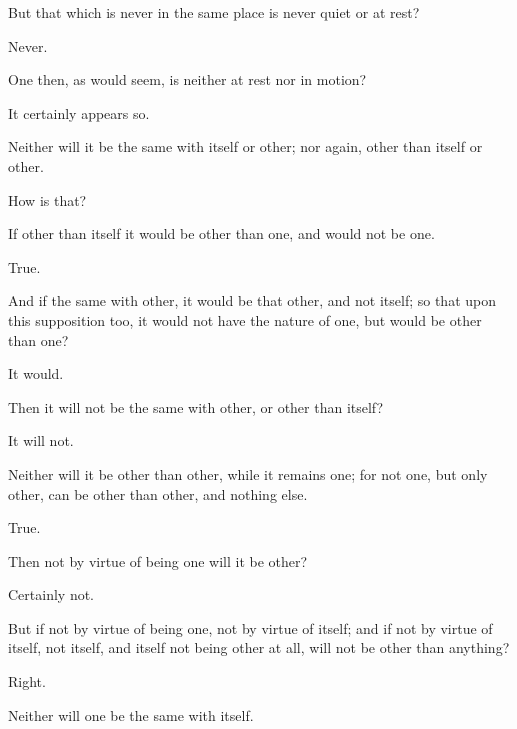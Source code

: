\documentclass[11pt,letter]{article}
\begin{document}
\par  But that which is never in the same place is never quiet or at rest?

\par  Never.

\par  One then, as would seem, is neither at rest nor in motion?

\par  It certainly appears so.

\par  Neither will it be the same with itself or other; nor again, other than itself or other.

\par  How is that?

\par  If other than itself it would be other than one, and would not be one.

\par  True.

\par  And if the same with other, it would be that other, and not itself; so that upon this supposition too, it would not have the nature of one, but would be other than one?

\par  It would.

\par  Then it will not be the same with other, or other than itself?

\par  It will not.

\par  Neither will it be other than other, while it remains one; for not one, but only other, can be other than other, and nothing else.

\par  True.

\par  Then not by virtue of being one will it be other?

\par  Certainly not.

\par  But if not by virtue of being one, not by virtue of itself; and if not by virtue of itself, not itself, and itself not being other at all, will not be other than anything?

\par  Right.

\par  Neither will one be the same with itself.
\end{document}
